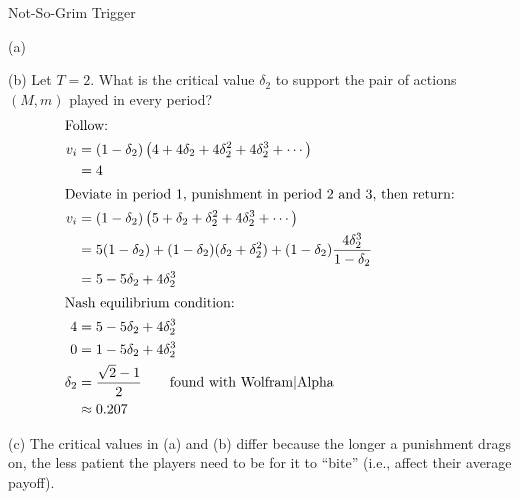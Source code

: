 \documentclass[8pt]{extarticle}
\begin{document}
\begin{problem}{Not-So-Grim Trigger}
\begin{problem}{(a)}
    \end{problem}
    \begin{problem}{(b)}
      Let $T = 2$. What is the critical value $\delta_2$ to support the pair of actions $(M,m)$ played in every period?
      \tcblower
      \begin{align*}
        \shortintertext{Follow:}
        v_i &= (1-\delta_2)\left(4 + 4\delta_2 + 4\delta_2^2 + 4\delta_2^3 + \cdots\right)\\
            &= 4\\
        \shortintertext{Deviate in period $1$, punishment in period $2$ and $3$, then return:}
        v_i &= (1-\delta_2)\left(5 + \delta_2 + \delta_2^2 + 4\delta_2^3 + \cdots\right) \\
            &= 5(1-\delta_2) + (1-\delta_2)(\delta_2 + \delta_2^2) + (1-\delta_2)\frac{4\delta_2^3}{1-\delta_2}\\
            &= 5 - 5\delta_2 + 4\delta_2^3\\
        \shortintertext{Nash equilibrium condition:}
        4 &= 5 - 5\delta_2 + 4\delta_2^3\\
        0 &= 1 - 5\delta_2 + 4\delta_2^3\\
        \delta_2 &= \frac{\sqrt{2}-1}{2} \tag*{found with Wolfram|Alpha}\\
                 &\approx 0.207
      \end{align*}
    \end{problem}
    \begin{problem}{(c)}
      The critical values in (a) and (b) differ because the longer a punishment drags on, the less patient the players need to be for it to ``bite'' (i.e., affect their average payoff).
    \end{problem}
  \end{problem}
\end{document}

